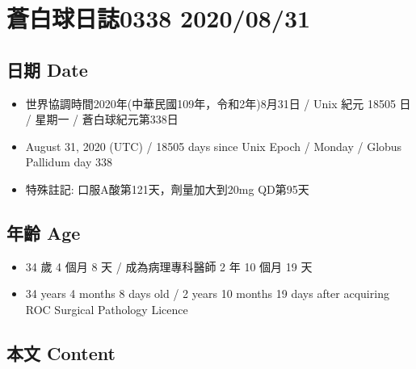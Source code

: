 \documentclass[a5paper, 11pt
]{book}
\providecommand{\tightlist}{%
  \setlength{\itemsep}{0pt}\setlength{\parskip}{0pt}}
\begin{document}
\hypertarget{ux84bcux767dux7403ux65e5ux8a8c0338-20200831}{%
\section{蒼白球日誌0338
2020/08/31}\label{ux84bcux767dux7403ux65e5ux8a8c0338-20200831}}

\hypertarget{ux65e5ux671f-date-91}{%
\subsection{日期 Date}\label{ux65e5ux671f-date-91}}

\begin{itemize}
\tightlist
\item
  世界協調時間2020年(中華民國109年，令和2年)8月31日 / Unix 紀元 18505 日
  / 星期一 / 蒼白球紀元第338日
\item
  August 31, 2020 (UTC) / 18505 days since Unix Epoch / Monday / Globus
  Pallidum day 338
\item
  特殊註記: 口服A酸第121天，劑量加大到20mg QD第95天
\end{itemize}

\hypertarget{ux5e74ux9f61-age-91}{%
\subsection{年齡 Age}\label{ux5e74ux9f61-age-91}}

\begin{itemize}
\tightlist
\item
  34 歲 4 個月 8 天 / 成為病理專科醫師 2 年 10 個月 19 天
\item
  34 years 4 months 8 days old / 2 years 10 months 19 days after
  acquiring ROC Surgical Pathology Licence
\end{itemize}

\hypertarget{ux672cux6587-content-91}{%
\subsection{本文 Content}\label{ux672cux6587-content-91}}
\end{document}
